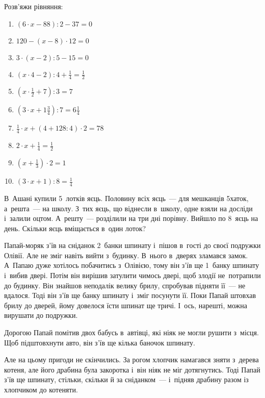 \problem
Розв’яжи рівняння:
\begin{multicols}{2}
    \begin{enumerate}
        \item $(6 \cdot x - 88) : 2 - 37 = 0$
        \item $120 - (x - 8) \cdot 12 = 0$
        \item $3 \cdot (x - 2) : 5 - 15 = 0$
        \item $(x \cdot 4 - 2) : 4 + \frac{1}{4} = \frac{1}{2}$
        \item $(x \cdot \frac{1}{2} + 7) : 3 = 7$
        \item $(3 \cdot x + 1\frac{3}{4}) : 7 = 6\frac{1}{4}$
        \item $\frac{1}{4} \cdot x + (4 + 128 : 4) \cdot 2 = 78$
        \item $2 \cdot x + \frac{1}{4} = \frac{1}{2}$
        \item $(x + \frac{1}{3}) \cdot 2 = 1$
        \item $(3 \cdot x + 1) : 8 = \frac{1}{4}$
    \end{enumerate}
\end{multicols}


\problem
В~Ашані купили 5~лотків яєць.
Половину всіх яєць~--- для мешканців 5хаток, а~решта~--- на школу.
З~тих яєць, що віднесли в~школу, одне взяли на досліди і~залили оцтом.
А~решту~--- розділили на три дні порівну. Вийшло по 8~яєць на день.
Скільки яєць вміщається в~один лоток? 


\problem
Папай-моряк з’їв на сніданок 2~банки шпинату і~пішов в~гості до своєї
подружки Олівії. Але не зміг навіть вийти з~будинку. В~нього в~дверях
зламався замок. А~Папаю дуже хотілось побачитись з~Олівією, тому він
з’їв ще 1~банку шпинату і~вибив двері. Потім він вирішив затулити
чимось двері, щоб злодії не~потрапили до будинку. Він знайшов неподалік
велику брилу, спробував підняти її~--- не вдалося. Тоді він з’їв ще банку
шпинату і~зміг посунути її. Поки Папай штовхав брилу до дверей, йому
довелося їсти шпинат ще тричі. І~ось, нарешті, можна вирушати до подружки.

Дорогою Папай помітив двох бабусь в~автівці, які ніяк не могли рушити
з~місця. Щоб підштовхнути авто, він з’їв ще кілька баночок шпинату.

Але на цьому пригоди не скінчились. За рогом хлопчик намагався зняти
з~дерева котеня, але його драбина була закоротка і~він ніяк не міг
дотягнутись. Тоді Папай з’їв ще шпинату, стільки, скільки й
за сніданком~--- і~підняв драбину разом із хлопчиком до котеняти.

